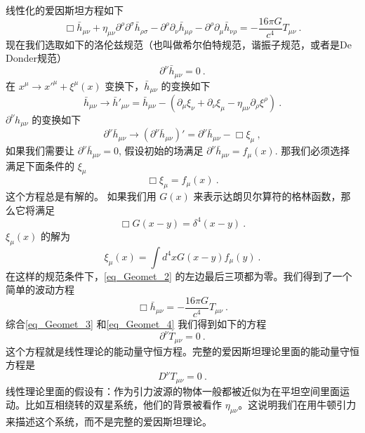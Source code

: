 线性化的爱因斯坦方程如下
\begin{equation}\label{eq_Geomet_2}
\Box \bar h_{\mu\nu} + \eta_{\mu\nu} \partial^\rho \partial^\sigma \bar h_{\rho\sigma} - \partial^\rho \partial_\nu \bar h_{\mu\rho} - \partial^\rho\partial_\mu \bar h_{\nu\rho} = - \frac{16\pi G}{c^4} T_{\mu\nu} ~. 
\end{equation}
现在我们选取如下的洛伦兹规范（也叫做希尔伯特规范，谐振子规范，或者是De Donder规范）
\begin{equation}\label{eq_Geomet_3}
\partial^\nu \bar h_{\mu\nu} = 0 ~. 
\end{equation}
在 $x^\mu\rightarrow x'^\mu+\xi^\mu(x)$ 变换下，$\bar h_{\mu\nu}$ 的变换如下
\begin{equation}
\bar h_{\mu\nu} \rightarrow \bar h'_{\mu\nu} = \bar h_{\mu\nu} - (\partial_\mu\xi_\nu+ \partial_\nu\xi_\mu - \eta_{\mu\nu} \partial_\rho\xi^\rho )~. 
\end{equation}
$\partial^\nu h_{\mu\nu}$ 的变换如下
\begin{equation}
\partial^\nu \bar h_{\mu\nu} \rightarrow (\partial^\nu \bar h_{\mu\nu})' = \partial^\nu \bar h_{\mu\nu} - \Box \xi_\mu ~, 
\end{equation}
如果我们需要让 $\partial^\nu \bar h_{\mu\nu} = 0$, 假设初始的场满足 $\partial^\nu \bar h_{\mu\nu} = f_\mu (x)$. 那我们必须选择满足下面条件的 $\xi_\mu$
\begin{equation}
\Box \xi_\mu = f_\mu (x) ~. 
\end{equation}
这个方程总是有解的。 如果我们用 $G(x)$ 来表示达朗贝尔算符的格林函数，那么它将满足
\begin{equation}
\Box G(x-y) = \delta^4 (x-y) ~.
\end{equation}
$\xi_\mu(x)$ 的解为
\begin{equation}
\xi_\mu(x) = \int d^4 x G(x-y) f_\mu(y) ~.
\end{equation}
在这样的规范条件下，\autoref{eq_Geomet_2} 的左边最后三项都为零。我们得到了一个简单的波动方程
\begin{equation}\label{eq_Geomet_4}
\Box \bar h_{\mu\nu} = - \frac{16\pi G}{c^4} T_{\mu\nu} ~. 
\end{equation}
综合\autoref{eq_Geomet_3} 和\autoref{eq_Geomet_4} 我们得到如下的方程
\begin{equation}
\partial^\nu T_{\mu\nu} = 0~.
\end{equation}
这个方程就是线性理论的能动量守恒方程。完整的爱因斯坦理论里面的能动量守恒方程是
\begin{equation}
D^\nu T_{\mu\nu} = 0 ~.
\end{equation}
线性理论里面的假设有：作为引力波源的物体一般都被近似为在平坦空间里面运动。比如互相绕转的双星系统，他们的背景被看作 $\eta_{\mu\nu}$。这说明我们在用牛顿引力来描述这个系统，而不是完整的爱因斯坦理论。
